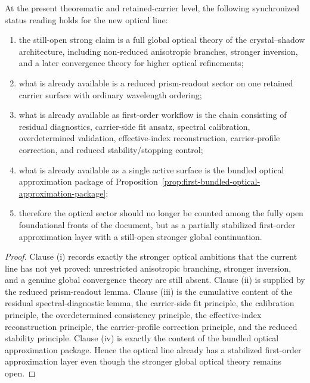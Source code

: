 \begin{proposition}
\label{prop:v323-optical-open-question-status-synchronization-principle}
At the present theorematic and retained-carrier level, the following synchronized status reading holds for the new optical line:
\begin{enumerate}[leftmargin=2em,label=(\roman*)]
  \item the still-open strong claim is a full global optical theory of the crystal--shadow architecture, including non-reduced anisotropic branches, stronger inversion, and a later convergence theory for higher optical refinements;
  \item what is already available is a reduced prism-readout sector on one retained carrier surface with ordinary wavelength ordering;
  \item what is already available as first-order workflow is the chain consisting of residual diagnostics, carrier-side fit ansatz, spectral calibration, overdetermined validation, effective-index reconstruction, carrier-profile correction, and reduced stability/stopping control;
  \item what is already available as a single active surface is the bundled optical approximation package of Proposition~\ref{prop:first-bundled-optical-approximation-package};
  \item therefore the optical sector should no longer be counted among the fully open foundational fronts of the document, but as a partially stabilized first-order approximation layer with a still-open stronger global continuation.
\end{enumerate}
\end{proposition}

\begin{proof}
Clause (i) records exactly the stronger optical ambitions that the current line has not yet proved: unrestricted anisotropic branching, stronger inversion, and a genuine global convergence theory are still absent. Clause (ii) is supplied by the reduced prism-readout lemma. Clause (iii) is the cumulative content of the residual spectral-diagnostic lemma, the carrier-side fit principle, the calibration principle, the overdetermined consistency principle, the effective-index reconstruction principle, the carrier-profile correction principle, and the reduced stability principle. Clause (iv) is exactly the content of the bundled optical approximation package. Hence the optical line already has a stabilized first-order approximation layer even though the stronger global optical theory remains open.
\end{proof}

